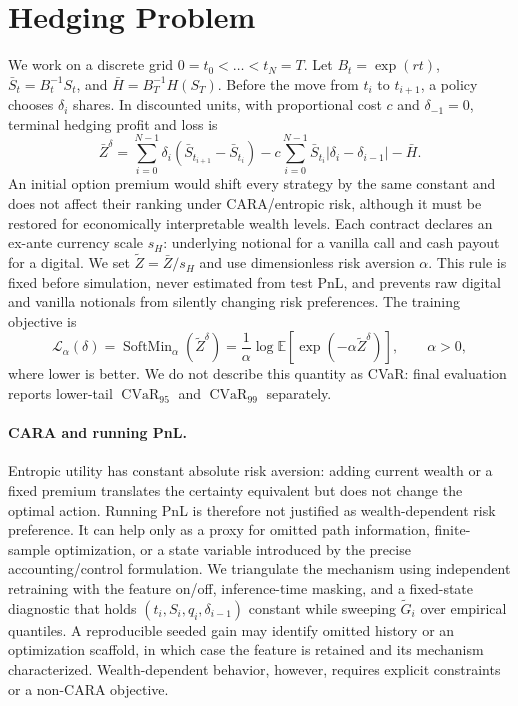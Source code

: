 \documentclass[sigconf,balance=false]{acmart}
\newcommand{\softmin}{\operatorname{SoftMin}}
\newcommand{\cvar}{\operatorname{CVaR}}
\begin{document}
\section{Hedging Problem}

We work on a discrete grid $0=t_0<\dots<t_N=T$.  Let
$B_t=\exp(rt)$, $\bar S_t=B_t^{-1}S_t$, and
$\bar H=B_T^{-1}H(S_T)$.  Before the move from $t_i$ to $t_{i+1}$, a policy
chooses $\delta_i$ shares.  In discounted units, with proportional cost $c$
and $\delta_{-1}=0$, terminal hedging profit and loss is
\begin{equation}
 \bar Z^\delta =
 \sum_{i=0}^{N-1}\delta_i(\bar S_{t_{i+1}}-\bar S_{t_i})
 -c\sum_{i=0}^{N-1}\bar S_{t_i}\lvert\delta_i-\delta_{i-1}\rvert
 -\bar H.
\label{eq:pnl}
\end{equation}
An initial option premium would shift every strategy by the same constant and
does not affect their ranking under CARA/entropic risk, although it must be
restored for economically interpretable wealth levels.  Each contract declares
an ex-ante currency scale $s_H$: underlying notional for a vanilla call and
cash payout for a digital.  We set $\widetilde Z=\bar Z/s_H$ and use
dimensionless risk aversion $\alpha$.  This rule is fixed before simulation,
never estimated from test PnL, and prevents raw digital and vanilla notionals
from silently changing risk preferences.  The training objective is
\begin{equation}
 \mathcal{L}_\alpha(\delta)
 = \softmin_\alpha(\widetilde Z^\delta)
 = \frac{1}{\alpha}\log
   \mathbb{E}\!\left[\exp(-\alpha\widetilde Z^\delta)\right],
 \qquad \alpha>0,
\label{eq:softmin}
\end{equation}
where lower is better.  We do not describe this quantity as CVaR: final
evaluation reports lower-tail $\cvar_{95}$ and $\cvar_{99}$ separately.

\paragraph{CARA and running PnL.}
Entropic utility has constant absolute risk aversion: adding current wealth or
a fixed premium translates the certainty equivalent but does not change the
optimal action.  Running PnL is therefore not justified as wealth-dependent
risk preference.  It can help only as a proxy for omitted path information,
finite-sample optimization, or a state variable introduced by the precise
accounting/control formulation.  We triangulate the mechanism using
independent retraining with the feature on/off, inference-time masking, and a
fixed-state diagnostic that holds $(t_i,S_i,q_i,\delta_{i-1})$ constant while
sweeping $\widetilde G_i$ over empirical quantiles.  A reproducible seeded gain
may identify omitted history or an optimization scaffold, in which case the
feature is retained and its mechanism characterized.  Wealth-dependent
behavior, however, requires explicit constraints or a non-CARA objective.
\end{document}
